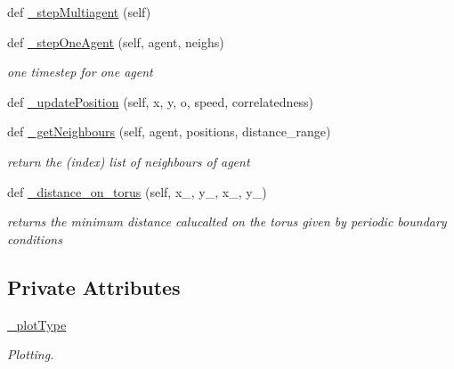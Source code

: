 \begin{DoxyCompactItemize}
\item 
def \hyperlink{class_mu_mo_t_1_1_mu_mo_tmultiagent_view_a80b7d1f8c2f44ea9f4154b79f0baacfb}{\+\_\+step\+Multiagent} (self)
\item 
def \hyperlink{class_mu_mo_t_1_1_mu_mo_tmultiagent_view_a87f5913cd055f8e4eaa70b058ad7d77b}{\+\_\+step\+One\+Agent} (self, agent, neighs)
\begin{DoxyCompactList}\small\item\em one timestep for one agent \end{DoxyCompactList}\item 
def \hyperlink{class_mu_mo_t_1_1_mu_mo_tmultiagent_view_aba4da96cc2e7682af895cda4b1310790}{\+\_\+update\+Position} (self, x, y, o, speed, correlatedness)
\item 
def \hyperlink{class_mu_mo_t_1_1_mu_mo_tmultiagent_view_ad3df4b96d9dec10c8b806eb6697c6028}{\+\_\+get\+Neighbours} (self, agent, positions, distance\+\_\+range)
\begin{DoxyCompactList}\small\item\em return the (index) list of neighbours of \textquotesingle{}agent\textquotesingle{} \end{DoxyCompactList}\item 
def \hyperlink{class_mu_mo_t_1_1_mu_mo_tmultiagent_view_aa88fd0656cfcc7c9671c2bcc61d7726e}{\+\_\+distance\+\_\+on\+\_\+torus} (self, x\+\_, y\+\_, x\+\_, y\+\_)
\begin{DoxyCompactList}\small\item\em returns the minimum distance calucalted on the torus given by periodic boundary conditions \end{DoxyCompactList}\end{DoxyCompactItemize}
\subsection*{Private Attributes}
\begin{DoxyCompactItemize}
\item 
\hyperlink{class_mu_mo_t_1_1_mu_mo_tmultiagent_view_a5feff4ca83ee97d6e09874496a4975d4}{\+\_\+plot\+Type}
\begin{DoxyCompactList}\small\item\em Plotting. \end{DoxyCompactList}\end{DoxyCompactItemize}
